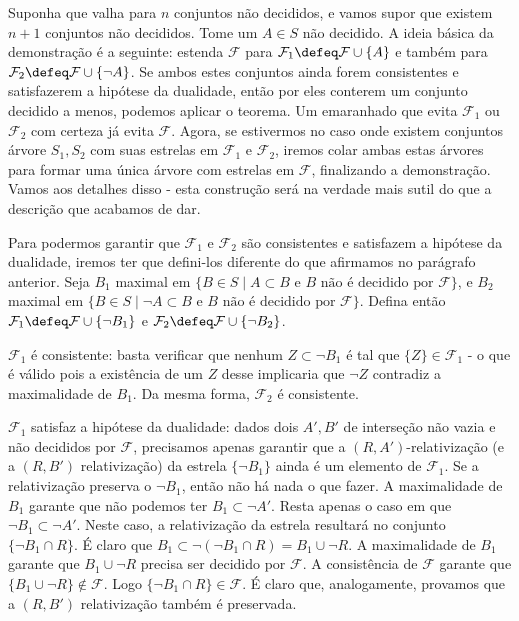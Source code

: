 \begin{prova}
    Suponha que valha para $n$ conjuntos não decididos, e vamos supor que existem $n+1$ conjuntos não decididos. Tome um $A \in S$ não decidido. A ideia básica da demonstração é a seguinte: estenda $\mathcal{F}$ para $\mathcal{F}_1 \defeq \mathcal{F} \cup \{A\}$ e também para $\mathcal{F}_2 \defeq \mathcal{F} \cup \{\lnot A\}$. Se ambos estes conjuntos ainda forem consistentes e satisfazerem a hipótese da dualidade, então por eles conterem um conjunto decidido a menos, podemos aplicar o teorema. Um emaranhado que evita $\mathcal{F}_1$ ou $\mathcal{F}_2$ com certeza já evita $\mathcal{F}$. Agora, se estivermos no caso onde existem conjuntos árvore $S_1, S_2$ com suas estrelas em $\mathcal{F}_1$ e $\mathcal{F}_2$, iremos colar ambas estas árvores para formar uma única árvore com estrelas em $\mathcal{F}$, finalizando a demonstração. Vamos aos detalhes disso - esta construção será na verdade mais sutil do que a descrição que acabamos de dar.

    Para podermos garantir que $\mathcal{F}_1$ e $\mathcal{F}_2$ são consistentes e satisfazem a hipótese da dualidade, iremos ter que defini-los diferente do que afirmamos no parágrafo anterior. Seja $B_1$ maximal em $\{B \in S \mid A \subset B \text{ e } B \text{ não é decidido por }\mathcal{F}\}$, e $B_2$ maximal em $\{B \in S \mid \lnot A \subset B \text{ e } B \text{ não é decidido por }\mathcal{F}\}$. Defina então $\mathcal{F}_1 \defeq \mathcal{F} \cup \{\lnot B_1\}$ e $\mathcal{F}_2 \defeq \mathcal{F} \cup \{\lnot B_2\}$. 

    $\mathcal{F}_1$ é consistente: basta verificar que nenhum $Z \subset \lnot B_1$ é tal que $\{Z\} \in \mathcal{F}_1$ - o que é válido pois a existência de um $Z$ desse implicaria que $\lnot Z$ contradiz a maximalidade de $B_1$. Da mesma forma, $\mathcal{F}_2$ é consistente.

    $\mathcal{F}_1$ satisfaz a hipótese da dualidade: dados dois $A',B'$ de interseção não vazia e não decididos por $\mathcal{F}$, precisamos apenas garantir que a $(R,A')$-relativização (e a $(R,B')$ relativização) da estrela $\{\lnot B_1\}$ ainda é um elemento de  $\mathcal{F}_1$. Se a relativização preserva o $\lnot B_1$, então não há nada o que fazer. A maximalidade de $B_1$ garante que não podemos ter $B_1 \subset \lnot A'$. Resta apenas o caso em que $\lnot B_1 \subset \lnot A'$. Neste caso, a relativização da estrela resultará no conjunto $\{ \lnot B_1 \cap R \}$. É claro que $B_1 \subset \lnot( \lnot B_1 \cap R ) = B_1 \cup \lnot R$. A maximalidade de $B_1$ garante que $B_1 \cup \lnot R$ precisa ser decidido por $\mathcal{F}$. A consistência de $\mathcal{F}$ garante que $\{B_1 \cup \lnot R\} \notin \mathcal{F}$. Logo $\{\lnot B_1 \cap R\} \in \mathcal{F}$. É claro que, analogamente, provamos que a $(R,B')$ relativização também é preservada.


\end{prova}
